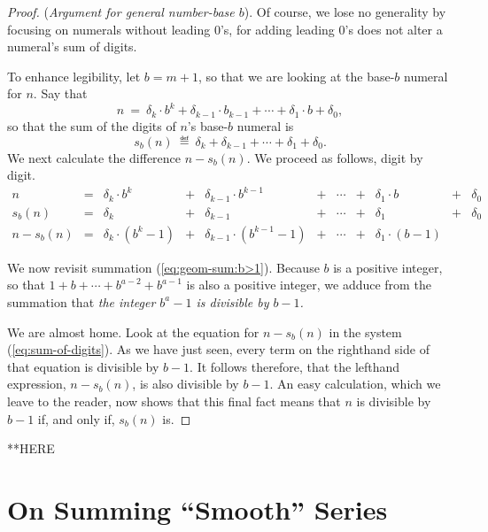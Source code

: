 \begin{proof}
({\it Argument for general number-base $b$}).
%
Of course, we lose no generality by focusing on numerals without
leading $0$'s, for adding leading $0$'s does not alter a numeral's sum
of digits.

To enhance legibility, let $b = m+1$, so that we are looking at the
base-$b$ numeral for $n$.  Say that
\[ n \ = \ \delta_k \cdot b^k + \delta_{k-1} \cdot b_{k-1} + \cdots +
\delta_1 \cdot b + \delta_0, \]
so that the sum of the digits of $n$'s base-$b$ numeral is
\[ s_b(n) \ \eqdef \ \delta_k + \delta_{k-1} + \cdots + \delta_1 + \delta_0. \]
We next calculate the difference $n - s_b(n)$.  We proceed as
follows, digit by digit.
\begin{equation}
\label{eq:sum-of-digits}
\begin{array}{ccccccccccc}
n & = &
\delta_k \cdot b^k & + & \delta_{k-1} \cdot b^{k-1} & + & \cdots
  & + & \delta_1 \cdot b & + & \delta_0 \\
s_b(n) & = &
\delta_k & + & \delta_{k-1} & + & \cdots & + & \delta_1 & + & \delta_0 \\
\hline
n - s_b(n) & = &
\delta_k \cdot (b^k -1) & + &
\delta_{k-1} \cdot (b^{k-1} -1) & + &
\cdots & + &
\delta_1 \cdot (b-1) & & 
\end{array}
\end{equation}

\medskip

We now revisit summation (\ref{eq:geom-sum:b>1}).  Because $b$ is a
positive integer, so that $1 + b + \cdots + b^{a-2} + b^{a-1}$ is also
a positive integer, we adduce from the summation that {\em the integer
  $b^a -1$ is divisible by $b-1$.}

We are almost home.  Look at the equation for $n - s_b(n)$ in the
system (\ref{eq:sum-of-digits}).  As we have just seen, every term on
the righthand side of that equation is divisible by $b-1$.  It follows
therefore, that the lefthand expression, $n - s_b(n)$, is also
divisible by $b-1$.  An easy calculation, which we leave to the
reader, now shows that this final fact means that $n$ is divisible by
$b-1$ if, and only if, $s_b(n)$ is.
\end{proof}


**HERE

\section{On Summing ``Smooth'' Series}
\label{sec:smooth-series}

